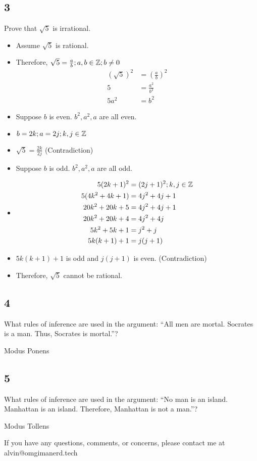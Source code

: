 \documentclass[letterpaper, 12pt]{math}
\begin{document}
\subsection*{3}
Prove that \( \sqrt{5} \) is irrational.
\begin{itemize}
  \item Assume \( \sqrt{5} \) is rational.
  \item Therefore, \( \sqrt{5} = \frac{a}{b}; a,b\in\mathbb{Z}; b\neq 0 \)
    \begin{align*}
      (\sqrt{5})^{2} &= (\frac{a}{b})^{2} \\
      5 &= \frac{a^{2}}{b^{2}} \\
      5a^{2} &= b^{2}
    \end{align*}
  \item Suppose \( b \) is even. \( b^{2}, a^{2}, a \) are all even.
  \item \( b = 2k; a = 2j; k,j\in\mathbb{Z} \)
  \item \( \sqrt{5} = \frac{2k}{2j} \) (Contradiction)
  \item Suppose \( b \) is odd. \( b^{2}, a^{2}, a \) are all odd.
  \item
    \begin{align*}
      5(2k+1)^{2} &= (2j+1)^{2}; k,j\in\mathbb{Z} \\
      5(4k^{2}+4k+1) &= 4j^{2}+4j+1 \\
      20k^{2}+20k+5 &= 4j^{2}+4j+1 \\
      20k^{2}+20k+4 &= 4j^{2}+4j \\
      5k^{2}+5k+1 &= j^{2}+j \\
      5k(k+1)+1 &= j(j+1)
    \end{align*}
  \item \( 5k(k+1)+1 \) is odd and \( j(j+1) \) is even. (Contradiction)
  \item Therefore, \( \sqrt{5} \) cannot be rational.
\end{itemize}

\subsection*{4}
What rules of inference are used in the argument: ``All men are mortal. Socrates
is a man. Thus, Socrates is mortal.''? \par
Modus Ponens

\subsection*{5}
What rules of inference are used in the argument: ``No man is an island.
Manhattan is an island. Therefore, Manhattan is not a man.''? \par
Modus Tollens

\begin{center}
  If you have any questions, comments, or concerns, please contact me at
  alvin@omgimanerd.tech
\end{center}
\end{document}
